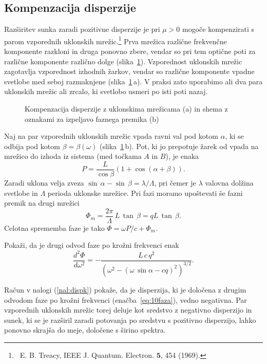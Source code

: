 \subsection*{Kompenzacija disperzije}
\label{kompdisp}
Razširitev sunka zaradi pozitivne disperzije je pri $\mu > 0$ mogoče kompenzirati
s parom vzporednih uklonskih mrežic.\footnote{~E. B. Treacy, IEEE J. Quantum. Electron. $\mathbf{5}$, 454 (1969).}
Prva mrežica različne frekvenčne komponente razkloni in druga ponovno
zbere, vendar so pri tem optične poti za različne komponente različno 
dolge (slika~\ref{fig:comp}).
Vzporednost uklonskih mrežic zagotavlja vzporednost izhodnih žarkov,
vendar so različne komponente vpadne svetlobe med seboj razmaknjene (slika~\ref{fig:comp}\,a).
V praksi zato uporabimo ali dva para uklonskih mrežic ali 
zrcalo, ki svetlobo usmeri po isti poti 
nazaj.
\begin{figure}[ht]
\centering
\def\svgwidth{115truemm} 

\caption{Kompenzacija disperzije z uklonskima mrežicama (a) in shema z
oznakami za izpeljavo faznega premika (b)}
\label{fig:comp}
\end{figure}

Naj na par vzporednih uklonskih mrežic vpada ravni val pod kotom $\alpha$, ki se odbija
pod kotom $\beta = \beta(\omega)$ (slika~\ref{fig:comp}\,b). 
Pot, ki jo prepotuje žarek od vpada na mrežico 
do izhoda iz sistema (med točkama $A$ in $B$), je enaka 
\begin{equation}
P = \frac{L}{\cos\beta} \left(1+\cos(\alpha + \beta)\right)\!.
\end{equation}
Zaradi uklona velja zveza $\sin\,\alpha - \sin\,\beta = \lambda/\Lambda$,
pri čemer je $\lambda$ valovna dolžina svetlobe in $\Lambda$ perioda uklonske mrežice. 
Pri fazi moramo upoštevati še fazni premik na drugi mrežici
\begin{equation}
\Phi_m=\frac{2\pi}{\Lambda} \, L \, \tan\,\beta = q L \,\tan\,\beta.
\end{equation}
Celotna sprememba faze je tako $\Phi = \omega P/c + \Phi_m$.

\begin{definition}
\label{nal:dispk}
Pokaži, da je drugi odvod faze po krožni frekvenci enak
\begin{equation}
\frac{d^2 \Phi}{d \omega^2} = - \frac{L\, c\, q^2}
{\left(\omega^2 - (\omega\, \sin\alpha - cq)^2\right)^{3/2}}.
\label{eq:10faza}
\end{equation}
\end{definition}
Račun v nalogi (\ref{nal:dispk})
pokaže, da je disperzija, ki je določena z drugim odvodom faze po krožni frekvenci
(enačba~\ref{eq:10faza}), vedno negativna. Par vzporednih uklonskih mrežic
torej deluje kot sredstvo
z negativno disperzijo in sunek, ki se je razširil zaradi potovanja
po sredstvu s pozitivno disperzijo, lahko ponovno skrajša do meje,
določene s širino spektra. 

